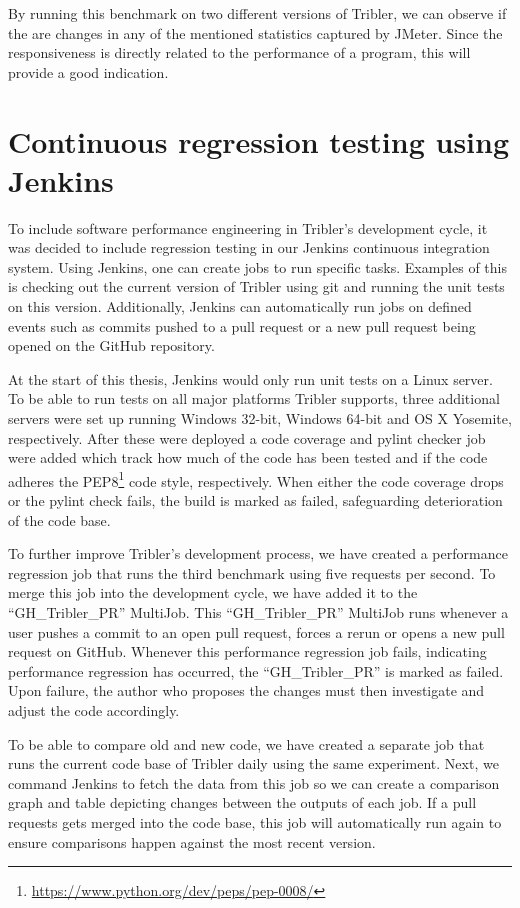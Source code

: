 By running this benchmark on two different versions of Tribler, we can observe if the are changes in any of the mentioned statistics captured by JMeter.
Since the responsiveness is directly related to the performance of a program, this will provide a good indication.


\section{Continuous regression testing using Jenkins}

To include software performance engineering in Tribler's development cycle, it was decided to include regression testing in our Jenkins continuous integration system.
Using Jenkins, one can create jobs to run specific tasks.
Examples of this is checking out the current version of Tribler using git and running the unit tests on this version.
Additionally, Jenkins can automatically run jobs on defined events such as commits pushed to a pull request or a new pull request being opened on the GitHub repository.

At the start of this thesis, Jenkins would only run unit tests on a Linux server.
To be able to run tests on all major platforms Tribler supports, three additional servers were set up running Windows 32-bit, Windows 64-bit and OS X Yosemite, respectively.
After these were deployed a code coverage and pylint checker job were added which track how much of the code has been tested and if the code adheres the PEP8\footnote{\url{https://www.python.org/dev/peps/pep-0008/}} code style, respectively.
When either the code coverage drops or the pylint check fails, the build is marked as failed, safeguarding deterioration of the code base.

To further improve Tribler's development process, we have created a performance regression job that runs the third benchmark using five requests per second.
To merge this job into the development cycle, we have added it to the \enquote{GH\_Tribler\_PR} MultiJob.
This \enquote{GH\_Tribler\_PR} MultiJob runs whenever a user pushes a commit to an open pull request, forces a rerun or opens a new pull request on GitHub.
Whenever this performance regression job fails, indicating performance regression has occurred, the \enquote{GH\_Tribler\_PR} is marked as failed.
Upon failure, the author who proposes the changes must then investigate and adjust the code accordingly.

To be able to compare old and new code, we have created a separate job that runs the current code base of Tribler daily using the same experiment.
Next, we command Jenkins to fetch the data from this job so we can create a comparison graph and table depicting changes between the outputs of each job.
If a pull requests gets merged into the code base, this job will automatically run again to ensure comparisons happen against the most recent version.

